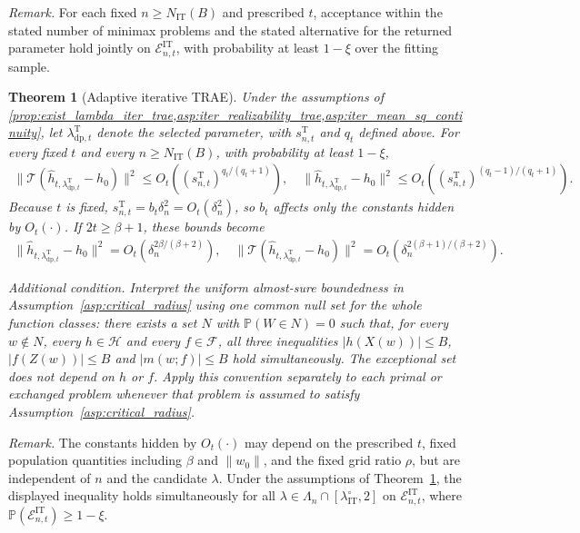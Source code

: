 \documentclass[12pt]{article}
\theoremstyle{plain}
\newtheorem{theorem}{Theorem}[section]
\theoremstyle{definition}
\theoremstyle{remark}
\begin{document}
\noindent\textit{Remark.} For each fixed $n\geqslant N_{\mathrm{IT}}(B)$ and prescribed $t$, acceptance within the stated number of minimax problems and the stated alternative for the returned parameter hold jointly on $\mathcal E_{n,t}^{\mathrm{IT}}$, with probability at least $1-\xi$ over the fitting sample.


\begin{theorem}[Adaptive iterative TRAE]\label{thm:iter_trae_rate}
Under the assumptions of
\cref{prop:exist_lambda_iter_trae,asp:iter_realizability_trae,asp:iter_mean_sq_continuity}, let
$\lambda_{\mathrm{dp},t}^{\mathrm T}$ denote the selected parameter, with
$s_{n,t}^{\mathrm T}$ and $q_t$ defined above.
For every fixed $t$ and every $n\geqslant N_{\mathrm{IT}}(B)$, with probability at least $1-\xi$,
\begin{align*}
\|\mathcal T(\hat h_{t,\lambda_{\mathrm{dp},t}^{\mathrm T}}-h_0)\|^2
\leqslant O_t\!\left(
(s_{n,t}^{\mathrm T})^{q_t/(q_t+1)}
\right), \quad  \|\hat h_{t,\lambda_{\mathrm{dp},t}^{\mathrm T}}-h_0\|^2
\leqslant O_t\!\left(
(s_{n,t}^{\mathrm T})^{(q_t-1)/(q_t+1)}
\right).
\end{align*}
Because $t$ is fixed, $s_{n,t}^{\mathrm T}=b_t\delta_n^2=O_t(\delta_n^2)$,
so $b_t$ affects only the constants hidden by $O_t(\cdot)$. If
$2t\geqslant\beta+1$, these bounds become
\begin{align*}
\|\hat h_{t,\lambda_{\mathrm{dp},t}^{\mathrm T}}-h_0\|^2
=O_t\!\left(\delta_n^{2\beta/(\beta+2)}\right), \quad
\|\mathcal T(\hat h_{t,\lambda_{\mathrm{dp},t}^{\mathrm T}}-h_0)\|^2
=O_t\!\left(\delta_n^{2(\beta+1)/(\beta+2)}\right).
\end{align*}

\emph{Additional condition.} Interpret the uniform almost-sure boundedness in Assumption~\ref{asp:critical_radius} using one common null set for the whole function classes: there exists a set $N$ with $\mathbb P(W\in N)=0$ such that, for every $w\notin N$, every $h\in\mathcal H$ and every $f\in\mathcal F$, all three inequalities $|h(X(w))|\leqslant B$, $|f(Z(w))|\leqslant B$ and $|m(w;f)|\leqslant B$ hold simultaneously. The exceptional set does not depend on $h$ or $f$. Apply this convention separately to each primal or exchanged problem whenever that problem is assumed to satisfy Assumption~\ref{asp:critical_radius}.
\end{theorem}

\noindent\textit{Remark.} The constants hidden by $O_t(\cdot)$ may depend on the prescribed $t$, fixed population quantities including $\beta$ and $\|w_0\|$, and the fixed grid ratio $\rho$, but are independent of $n$ and the candidate $\lambda$. Under the assumptions of Theorem~\ref{thm:iter_trae_rate}, the displayed inequality holds simultaneously for all $\lambda\in\Lambda_n\cap[\lambda_{\mathrm{IT}}^\circ,2]$ on $\mathcal E_{n,t}^{\mathrm{IT}}$, where $\mathbb P(\mathcal E_{n,t}^{\mathrm{IT}})\geqslant1-\xi$.
\end{document}
